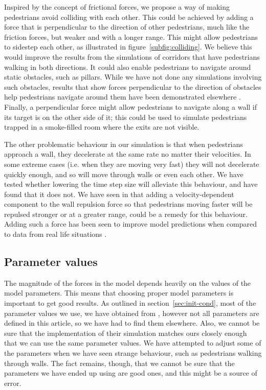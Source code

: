 Inspired by the concept of frictional forces, we propose a way of making 
pedestrians avoid colliding with each other. This could be achieved by adding 
a force that is perpendicular to the direction of other pedestrians, much like 
the friction forces, but weaker and with a longer range.  This might allow 
pedestrians to sidestep each other, as illustrated in 
figure~\ref{subfig:colliding}. We believe this would improve the results from 
the simulations of corridors that have pedestrians walking in both directions.  
It could also enable pedestrians to navigate around static obstacles, such as 
pillars. While we have not done any simulations involving such obstacles, 
results that show forces perpendicular to the direction of obstacles help 
pedestrians navigate around them have been demonstrated elsewhere \cite{tang}. 
Finally, a perpendicular force might allow pedestrians to navigate along a 
wall if its target is on the other side of it; this could be used to simulate 
pedestrians trapped in a smoke-filled room where the exits are not visible.

The other problematic behaviour in our simulation is that when pedestrians 
approach a wall, they decelerate at the same rate no matter their velocities.  
In some extreme cases (i.e. when they are moving very fast) they will not 
decelerate quickly enough, and so will move through walls or even each other.  
We have tested whether lowering the time step size will alleviate this 
behaviour, and have found that it does not. We have seen in \cite{ABconstant} 
that adding a  velocity-dependent component to the wall repulsion force so 
that pedestrians moving faster will be repulsed stronger or at a greater 
range, could be a remedy for this behaviour. Adding such a force has been seen 
to improve model predictions when compared to data from real life situations 
\cite{ABconstant}.

\subsection{Parameter values}
The magnitude of the forces in the model depends heavily on the values of the 
model parameters. This means that choosing proper model parameters is 
important to get good results. As outlined in section~\ref{sec:init-cond}, 
most of the parameter values we use, we have obtained from \cite{self-org}, 
however not all parameters are defined in this article, so we have had to find 
them elsewhere. Also, we cannot be sure that the implementation of their 
simulation matches ours closely enough that we can use the same parameter 
values.  We have attempted to adjust some of the parameters when we have seen 
strange behaviour, such as pedestrians walking through walls. The fact 
remains, though, that we cannot be sure that the parameters we have ended up 
using are good ones, and this might be a source of error.


